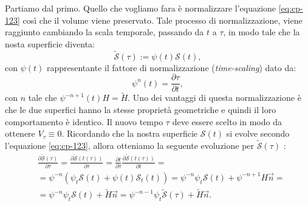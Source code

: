 Partiamo dal primo. Quello che vogliamo fara è normalizzare l'equazione \eqref{eq:cp-123} così che il volume viene preservato. Tale processo di normalizzazione, viene raggiunto cambiando la scala temporale, passando da $t$ a $\tau$, in modo tale che la nosta superficie diventa:
\[
\mathcal{\tilde{S}}(\tau):=\psi(t)\mathcal{S}(t),
\]
con $\psi(t)$ rappresentante il fattore di normalizzazione (\emph{time-scaling}) dato da:
\[
\psi^n(t) = \frac{\partial \tau}{\partial t},
\]
con $n$ tale che $\psi^{-n+1}(t)H=\tilde{H}$. Uno dei vantaggi di questa normalizzazione è che le due superfici hanno la stesse proprietà geometriche e quindi il loro comportamento è identico. Il nuovo tempo $\tau$ deve essere scelto in modo da ottenere $V_{\tau}\equiv 0$. Ricordando che la nostra superficie $\mathcal{S}(t)$ si evolve secondo l'equazione \eqref{eq:cp-123}, allora otteniamo la seguente evoluzione per $\mathcal{\tilde{S}}(\tau)$ : 
\[
\begin{aligned}
  &\frac{\partial\mathcal{\tilde{S}}(\tau)}{\partial\tau} =  \frac{\partial\mathcal{\tilde{S}}(t(\tau))}{\partial\tau} = \frac{\partial t}{\partial\tau}\frac{\partial\mathcal{\tilde{S}}(t(\tau))}{\partial t} =\\
  &=\psi^{-n}\left(\psi_t\mathcal{S}(t)+\psi(t)\mathcal{S}_t(t)\right)=\psi^{-n}\psi_t\mathcal{S}(t)+\psi^{-n+1}H\vec{n}=\\
  &=\psi^{-n}\psi_t\mathcal{S}(t)+\tilde{H}\vec{n}=\psi^{-n-1}\psi_t\mathcal{\tilde{S}}(\tau)+\tilde{H}\vec{n}.
\end{aligned}
\]

